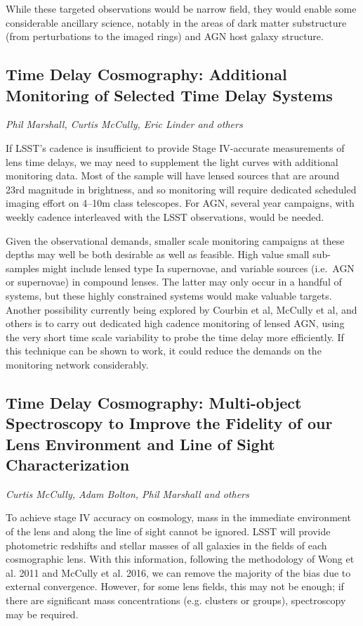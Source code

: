 While these targeted observations would be narrow field, they would
enable some considerable ancillary science, notably  in the areas of
dark matter substructure (from perturbations to the imaged rings) and
AGN host galaxy structure.


\subsection{Time Delay Cosmography: Additional Monitoring of Selected Time Delay Systems}
{\it Phil Marshall, Curtis McCully, Eric Linder and others}

If LSST's cadence is insufficient to provide Stage IV-accurate
measurements of lens time delays, we may need to supplement the light
curves with additional monitoring data. Most of the sample will have
lensed sources that are around 23rd magnitude in brightness, and so
monitoring will require dedicated scheduled imaging effort on 4--10m
class telescopes. For AGN, several year campaigns, with
weekly cadence interleaved with the LSST observations, would be needed.

Given the observational demands,
smaller scale monitoring campaigns at these depths may well be
both desirable as well as feasible. High value small sub-samples might include
lensed type Ia supernovae, and variable sources (i.e.\ AGN or
supernovae) in compound lenses.
The latter may only occur in a handful of systems, but
these highly constrained systems would make valuable targets. Another
possibility currently being explored by Courbin et al, McCully et al,
and others is to carry out dedicated high cadence monitoring of lensed
AGN, using the very short time scale variability to probe the time delay
more efficiently. If this technique can be shown to work, it could
reduce the demands on the monitoring network considerably.


\subsection{Time Delay Cosmography: Multi-object Spectroscopy to Improve the Fidelity of our Lens Environment and Line of Sight Characterization}
{\it Curtis McCully, Adam Bolton, Phil Marshall and others}

To achieve stage IV accuracy on cosmology, mass in the immediate environment of the lens and along the line of sight cannot be ignored. LSST will provide photometric redshifts and stellar masses of all
galaxies in the fields of each cosmographic lens. With this information, following the methodology of Wong et al. 2011 and McCully et al. 2016, we can remove the majority of the bias due to external convergence. However, for some lens fields, this may not be enough; if there are significant mass concentrations (e.g. clusters or groups), spectroscopy may be required.

